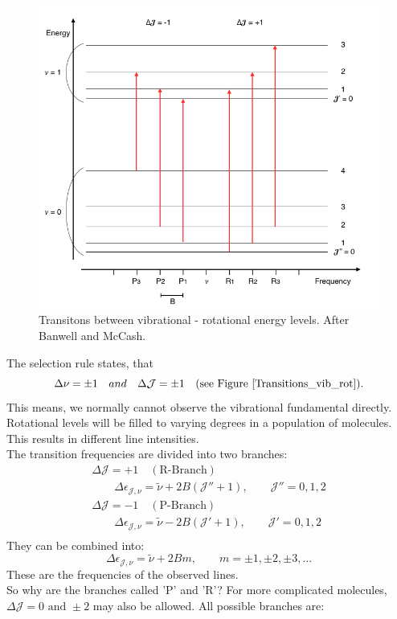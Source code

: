  \begin{figure}[htbp]
\begin{center}
\includegraphics[width=1\textwidth]{figures/Transitions_vib_rot}
\caption{Transitons between vibrational - rotational energy levels. After Banwell and McCash.}
\label{Transitions_vib_rot}
\end{center}
\end{figure}
 
 The selection rule states, that
 \begin{equation}
\Delta \nu = \pm 1 \text \quad {and} \quad \Delta \mathcal{J} = \pm 1 \quad \text{(see Figure \ref{Transitions_vib_rot})}.
\end{equation}
This means, we normally cannot observe the vibrational fundamental directly. Rotational levels will be filled to varying degrees in a population of molecules. This results in different line intensities. \\
The transition frequencies are divided into two branches:
\begin{gather*}
\Delta \mathcal{J} = +1 \quad (\text{R-Branch}) \\
\qquad \Delta \epsilon_{\mathcal{J},\nu} = \tilde{\nu} + 2 B ( \mathcal{J''} + 1), 
	\qquad \mathcal{J''} = 0, 1, 2  \\
\Delta \mathcal{J} = -1 \quad (\text{P-Branch}) \\
\qquad \Delta \epsilon_{\mathcal{J},\nu} = \tilde{\nu} - 2 B ( \mathcal{J'} + 1) , 
	\qquad \mathcal{J'} = 0, 1, 2  \\ 
\end{gather*}
 They can be combined into: 
 \begin{equation}
\Delta \epsilon_{\mathcal{J},\nu} = \tilde{\nu} + 2 B m , 
	\qquad m = \pm1, \pm2, \pm3, ...
\end{equation}
These are the frequencies of the observed lines. \\
So why are the branches called 'P' and 'R'? For more complicated molecules, $\Delta \mathcal{J} = 0 \text{ and } \pm 2$ may also be allowed. All possible branches are:


